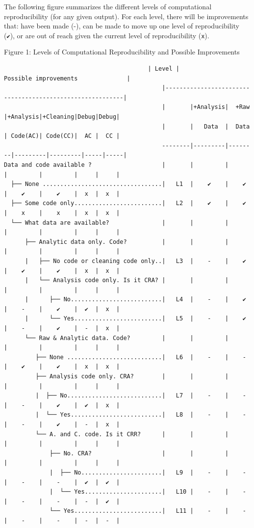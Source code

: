 \documentclass[]{book}
\begin{document}
The following figure summarizes the different levels of computational reproducibility (for any given output). For each level, there will be improvements that: have been made (-), can be made to move up one level of reproducibility (\texttt{✔}), or are out of reach given the current level of reproducibility (\texttt{x}).

Figure 1: Levels of Computational Reproducibility and Possible Improvements

\begin{verbatim}
                                         | Level |               Possible improvements              |
                                             |----------------------------------------------------------|
                                             |       |+Analysis|  +Raw  |+Analysis|+Cleaning|Debug|Debug|
                                             |       |   Data  |  Data  | Code(AC)| Code(CC)|  AC |  CC |
                                             --------|---------|--------|---------|---------|-----|-----|
Data and code available ?                    |       |         |        |         |         |     |     |     
  ├── None ..................................|   L1  |    ✔    |    ✔   |    ✔    |    ✔    |  x  |  x  |
  ├── Some code only.........................|   L2  |    ✔    |    ✔   |    x    |    x    |  x  |  x  |
  └── What data are available?               |       |         |        |         |         |     |     |
      ├── Analytic data only. Code?          |       |         |        |         |         |     |     |
      |   ├── No code or cleaning code only..|   L3  |    -    |    ✔   |    ✔    |    ✔    |  x  |  x  |
      |   └── Analysis code only. Is it CRA? |       |         |        |         |         |     |     |
      |      ├── No..........................|   L4  |    -    |    ✔   |    -    |    ✔    |  ✔  |  x  |
      |      └── Yes.........................|   L5  |    -    |    ✔   |    -    |    ✔    |  -  |  x  |
      └── Raw & Analytic data. Code?         |       |         |        |         |         |     |     |
         ├── None ...........................|   L6  |    -    |    -   |    ✔    |    ✔    |  x  |  x  |
         ├── Analysis code only. CRA?        |       |         |        |         |         |     |     |
         |  ├── No...........................|   L7  |    -    |    -   |    -    |    ✔    |  ✔  |  x  |
         |  └── Yes..........................|   L8  |    -    |    -   |    -    |    ✔    |  -  |  x  |
         └── A. and C. code. Is it CRR?      |       |         |        |         |         |     |     |
             ├── No. CRA?                    |       |         |        |         |         |     |     |
             |  ├── No.......................|   L9  |    -    |    -   |    -    |    -    |  ✔  |  ✔  |
             |  └── Yes......................|   L10 |    -    |    -   |    -    |    -    |  -  |  ✔  |
             └── Yes.........................|   L11 |    -    |    -   |    -    |    -    |  -  |  -  |
\end{verbatim}
\end{document}
